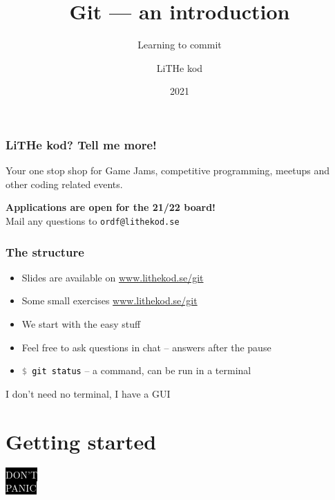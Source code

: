 \documentclass{beamer}
\title[Git]{Git --- an introduction}
\subtitle{Learning to commit}
\author{LiTHe kod}
\date{2021}
\newcommand{\command}[1]{\colorbox{black!90!white!10!}{\vphantom{Ep}\texttt{\textcolor{gray}{\$} \textcolor{black}{#1}}}}
\begin{document}
\frame{\titlepage}
\frame{\tableofcontents}


\begin{frame}[fragile]
  \frametitle{LiTHe kod? Tell me more!}
  Your one stop shop for Game Jams, competitive programming, meetups and other coding related events.

  \vspace{2.0em}
  \textbf{Applications are open for the 21/22 board!} \\
  Mail any questions to \texttt{ordf@lithekod.se} \\
\end{frame}

\begin{frame}[fragile]
  \frametitle{The structure}
  
  \begin{itemize}[<+->]
    \item Slides are available on \url{www.lithekod.se/git}
    \item Some small exercises \url{www.lithekod.se/git}
    \item We start with the easy stuff
    \item Feel free to ask questions in chat -- answers after the pause
    \item \command{git status} -- a command, can be run in a terminal
  \end{itemize}

\end{frame}

\begin{frame}[fragile]
  \begin{center}
    I don't need no terminal, I have a GUI
  \end{center}
\end{frame}

\section{Getting started}

\begin{frame}[fragile]
  \begin{center}
    \Huge \colorbox{black}{\textcolor{white}{DON'T}} \\
    \Huge \colorbox{black}{\textcolor{white}{PANIC}}
  \end{center}
\end{frame}
\end{document}
